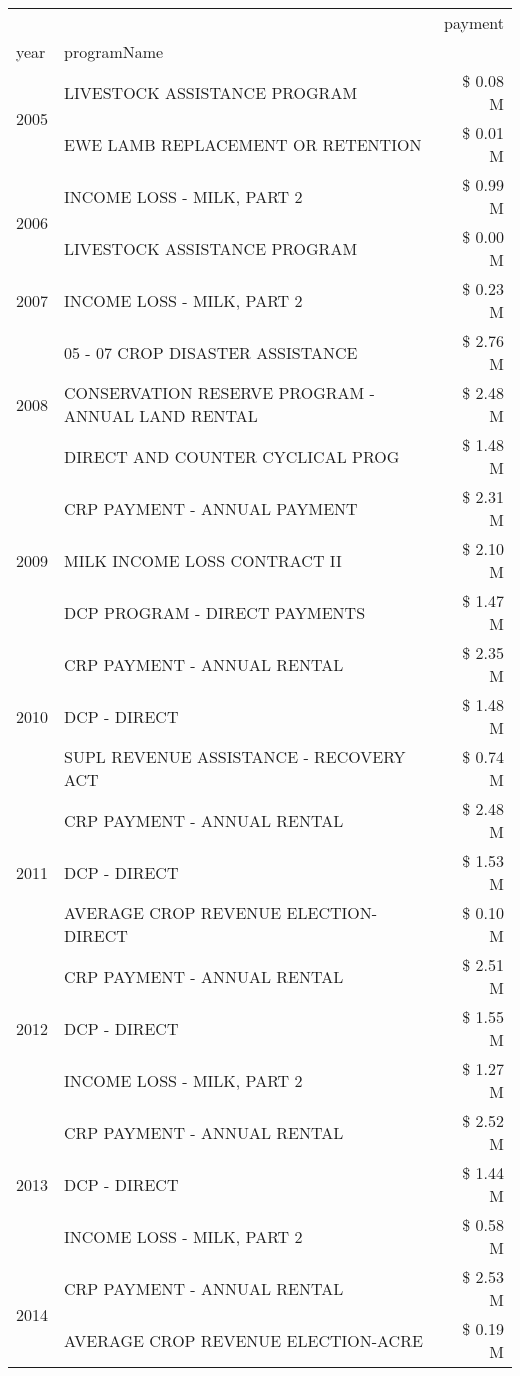 \begin{tabular}{llr}
\toprule
 &  & payment \\
year & programName &  \\
\midrule
\multirow[t]{2}{*}{2005} & LIVESTOCK ASSISTANCE PROGRAM & \$ 0.08 M \\
 & EWE LAMB REPLACEMENT OR RETENTION & \$ 0.01 M \\
\cline{1-3}
\multirow[t]{2}{*}{2006} & INCOME LOSS - MILK, PART 2 & \$ 0.99 M \\
 & LIVESTOCK ASSISTANCE PROGRAM & \$ 0.00 M \\
\cline{1-3}
2007 & INCOME LOSS - MILK, PART 2 & \$ 0.23 M \\
\cline{1-3}
\multirow[t]{3}{*}{2008} & 05 - 07 CROP DISASTER ASSISTANCE & \$ 2.76 M \\
 & CONSERVATION RESERVE PROGRAM - ANNUAL LAND RENTAL & \$ 2.48 M \\
 & DIRECT AND COUNTER CYCLICAL PROG & \$ 1.48 M \\
\cline{1-3}
\multirow[t]{3}{*}{2009} & CRP PAYMENT - ANNUAL PAYMENT & \$ 2.31 M \\
 & MILK INCOME LOSS CONTRACT II & \$ 2.10 M \\
 & DCP PROGRAM - DIRECT PAYMENTS & \$ 1.47 M \\
\cline{1-3}
\multirow[t]{3}{*}{2010} & CRP PAYMENT - ANNUAL RENTAL & \$ 2.35 M \\
 & DCP - DIRECT & \$ 1.48 M \\
 & SUPL REVENUE ASSISTANCE - RECOVERY ACT & \$ 0.74 M \\
\cline{1-3}
\multirow[t]{3}{*}{2011} & CRP PAYMENT - ANNUAL RENTAL & \$ 2.48 M \\
 & DCP - DIRECT & \$ 1.53 M \\
 & AVERAGE CROP REVENUE ELECTION-DIRECT & \$ 0.10 M \\
\cline{1-3}
\multirow[t]{3}{*}{2012} & CRP PAYMENT - ANNUAL RENTAL & \$ 2.51 M \\
 & DCP - DIRECT & \$ 1.55 M \\
 & INCOME LOSS - MILK, PART 2 & \$ 1.27 M \\
\cline{1-3}
\multirow[t]{3}{*}{2013} & CRP PAYMENT - ANNUAL RENTAL & \$ 2.52 M \\
 & DCP - DIRECT & \$ 1.44 M \\
 & INCOME LOSS - MILK, PART 2 & \$ 0.58 M \\
\cline{1-3}
\multirow[t]{3}{*}{2014} & CRP PAYMENT - ANNUAL RENTAL & \$ 2.53 M \\
 & AVERAGE CROP REVENUE ELECTION-ACRE & \$ 0.19 M \\

\end{tabular}
